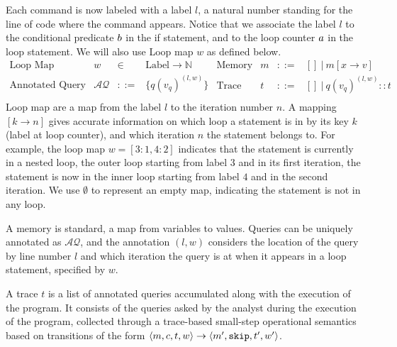 Each command is now labeled with a label $l$, a natural number standing for the line of code where the command appears. Notice that we associate the label $l$ to the conditional predicate $b$ in the if statement, and to the loop counter $a$ in the loop statement. We will also use  Loop map $w$ as defined below.  
\[
\begin{array}{llll}
 \mbox{Loop Map} & w & \in & \mbox{Label} \to \mathbb{N} \\
\mbox{Annotated Query} & \mathcal{AQ}  & ::= & \{ q(v_q)^{(l,w)}  \} \\
\end{array}
\begin{array}{llll}
    \mbox{Memory} & m & ::= & [] ~|~ m[x \to v] \\
\mbox{Trace} & t & ::= & [] ~|~ q(v_q)^{(l, w) } :: t \\
\end{array}
\]
  Loop map are a map from the label $l$ to the iteration number $n$.
  A mapping $[k \to n]$ gives accurate information on which loop a statement is in by its key $k$ (label at loop counter), and which iteration $n$ the statement belongs to.
  For example, the loop map $w=[3:1, 4:2]$ indicates that the statement is currently in a nested loop, the outer loop starting from label $3$ and in its first iteration, the statement is now in the inner loop starting from label $4$ and in the second iteration. We use $\emptyset$ to represent an empty map, indicating the statement is not in any loop.

  A memory is standard, a map from variables to values. Queries can be uniquely annotated as $\mathcal{AQ}$, and the annotation $(l,w)$ considers the location of the query by line number $l$ and which iteration the query is at when it appears in a loop statement, specified by $w$.
 
  A trace $t$ is a list of annotated queries accumulated along with the execution of the program. 
  It consists of the queries asked by the analyst during the execution of the program,
collected through
  a trace-based small-step operational semantics based on transitions of the form $ \langle m,c, t, w \rangle \to \langle m', \mathtt{skip}, t', w' \rangle $.

